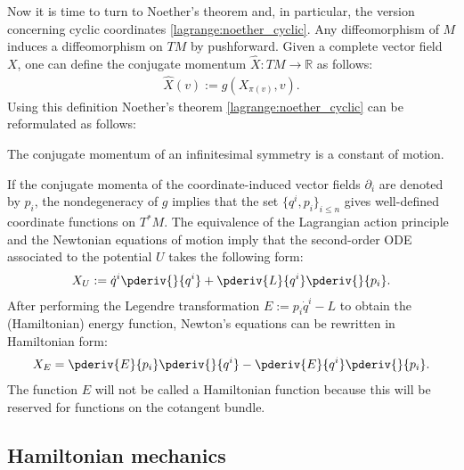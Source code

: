     Now it is time to turn to Noether's theorem and, in particular, the version concerning cyclic coordinates \ref{lagrange:noether_cyclic}. Any diffeomorphism of $M$ induces a diffeomorphism on $TM$ by pushforward.
    Given a complete vector field $X$, one can define the conjugate momentum $\widehat{X}:TM\rightarrow\mathbb{R}$ as follows:
    \begin{gather}
        \label{lagrange:metric_conjugate_momentum}
        \widehat{X}(v) := g(X_{\pi(v)},v).
    \end{gather}
    Using this definition Noether's theorem \ref{lagrange:noether_cyclic} can be reformulated as follows:
    \begin{theorem}
        The conjugate momentum of an infinitesimal symmetry is a constant of motion.
    \end{theorem}

    If the conjugate momenta of the coordinate-induced vector fields $\partial_i$ are denoted by $p_i$, the nondegeneracy of $g$ implies that the set $\{q^i,p_i\}_{i\leq n}$ gives well-defined coordinate functions on $T^*M$. The equivalence of the Lagrangian action principle and the Newtonian equations of motion imply that the second-order ODE associated to the potential $U$ takes the following form:
    \begin{gather}
        X_U := \dot{q}^i\pderiv{}{q^i} + \pderiv{L}{q^i}\pderiv{}{p_i}.
    \end{gather}
    After performing the Legendre transformation $E:=p_i\dot{q}^i-L$ to obtain the (Hamiltonian) energy function, Newton's equations can be rewritten in Hamiltonian form:
    \begin{gather}
        X_E = \pderiv{E}{p_i}\pderiv{}{q^i}-\pderiv{E}{q^i}\pderiv{}{p_i}.
    \end{gather}
    The function $E$ will not be called a Hamiltonian function because this will be reserved for functions on the cotangent bundle.

\subsection{Hamiltonian mechanics}

